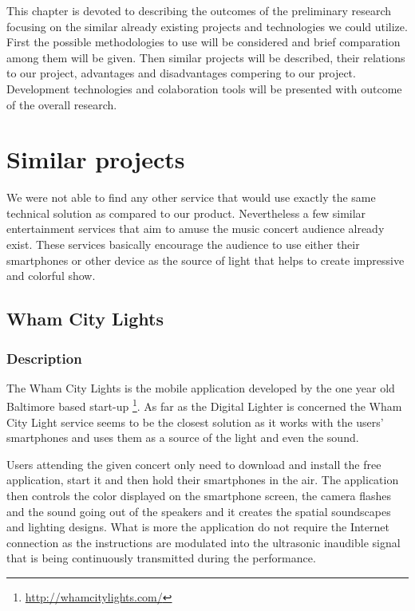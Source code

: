 This chapter is devoted to describing the outcomes of the preliminary research focusing on the similar already existing projects and technologies we could utilize. 
First the possible methodologies to use will be considered and brief comparation among them will be given.
Then similar projects will be described, their relations to our project, advantages and disadvantages compering to our project.
Development technologies and colaboration tools will be presented with outcome of the overall research. 


\section{Similar projects}

We were not able to find any other service that would use exactly the same technical solution as compared to our product. 
Nevertheless a few similar entertainment services that aim to amuse the music concert audience already exist. 
These services basically encourage the audience to use either their smartphones or other device as the source of light that helps to create impressive and colorful show.

\subsection{Wham City Lights}

\subsubsection{Description}
The Wham City Lights is the mobile application developed by the one year old Baltimore based start-up \footnote{\url{http://whamcitylights.com/}}. 
As far as the Digital Lighter is concerned the Wham City Light service seems to be the closest solution as it works with the users' smartphones and uses them as a source of the light and even the sound.

Users attending the given concert only need to download and install the free application, start it and then hold their smartphones in the air.
The application then controls the color displayed on the smartphone screen, the camera flashes and the sound going out of the speakers and it creates the spatial soundscapes and lighting designs.
What is more the application do not require the Internet connection as the instructions are modulated into the ultrasonic inaudible signal that is being continuously transmitted during the performance.

